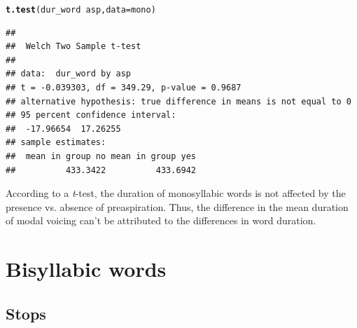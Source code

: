 \documentclass[a4paper,11pt]{article}\usepackage[]{graphicx}\usepackage[]{color}
\makeatletter
\newcommand{\hlopt}[1]{\textcolor[rgb]{0,0,0}{#1}}%
\newcommand{\hlstd}[1]{\textcolor[rgb]{0.345,0.345,0.345}{#1}}%
\newcommand{\hlkwc}[1]{\textcolor[rgb]{0.333,0.667,0.333}{#1}}%
\newcommand{\hlkwd}[1]{\textcolor[rgb]{0.737,0.353,0.396}{\textbf{#1}}}%
\newenvironment{kframe}{%
 \def\at@end@of@kframe{}%
 \ifinner\ifhmode%
  \def\at@end@of@kframe{\end{minipage}}%
  \begin{minipage}{\columnwidth}%
 \fi\fi%
 \def\FrameCommand##1{\hskip\@totalleftmargin \hskip-\fboxsep
 \colorbox{shadecolor}{##1}\hskip-\fboxsep
     \hskip-\linewidth \hskip-\@totalleftmargin \hskip\columnwidth}%
 \MakeFramed {\advance\hsize-\width
   \@totalleftmargin\z@ \linewidth\hsize
   \@setminipage}}%
 {\par\unskip\endMakeFramed%
 \at@end@of@kframe}
\newenvironment{knitrout}{}{} %
\makeatother
\begin{document}
\begin{knitrout}
\color{fgcolor}\begin{kframe}
\begin{alltt}
\hlkwd{t.test}\hlstd{(dur_word} \hlopt{~} \hlstd{asp,} \hlkwc{data} \hlstd{= mono)}
\end{alltt}
\begin{verbatim}
## 
## 	Welch Two Sample t-test
## 
## data:  dur_word by asp
## t = -0.039303, df = 349.29, p-value = 0.9687
## alternative hypothesis: true difference in means is not equal to 0
## 95 percent confidence interval:
##  -17.96654  17.26255
## sample estimates:
##  mean in group no mean in group yes 
##          433.3422          433.6942
\end{verbatim}
\end{kframe}
\end{knitrout}

According to a \textit{t}-test, the duration of monosyllabic words is not affected by the presence vs. absence of preaspiration.
Thus, the difference in the mean duration of modal voicing can't be attributed to the differences in word duration.

\section{Bisyllabic words}

\subsection{Stops}
\end{document}
